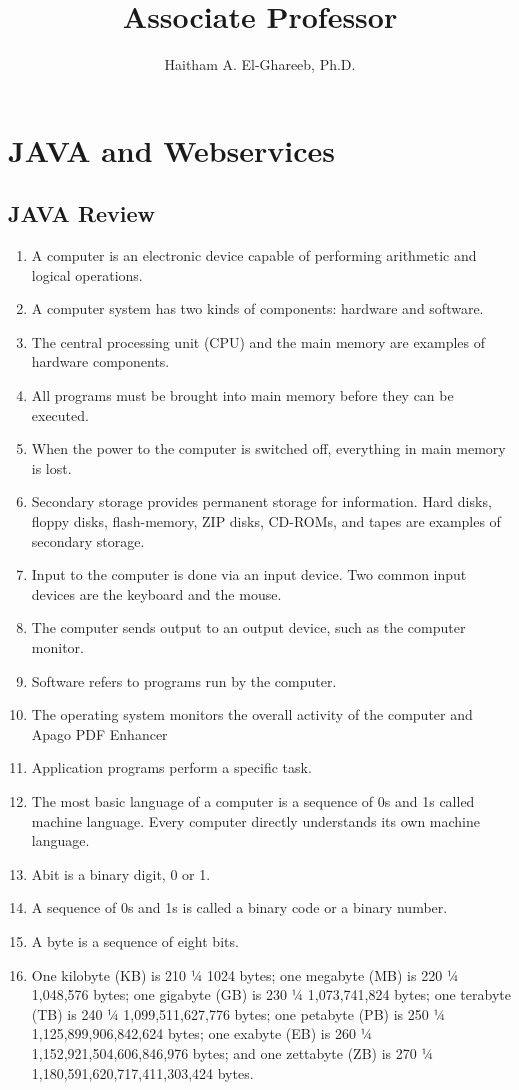 \documentclass[12pt,a4paper,final,twoside,onecolumn,titlepage]{book}
\author{Haitham A. El-Ghareeb, Ph.D.}
\title{Associate Professor}
\begin{document}
\cleardoublepage
{}
\tableofcontents

\chapter{JAVA and Webservices}
\section{JAVA Review}
\begin{enumerate}
\item A computer is an electronic device capable of performing arithmetic and logical operations.
\item A computer system has two kinds of components: hardware and software.
\item The central processing unit (CPU) and the main memory are examples of hardware components.
\item All programs must be brought into main memory before they can be executed.
\item When the power to the computer is switched off, everything in main memory is lost.
\item Secondary storage provides permanent storage for information. Hard disks, floppy disks, flash-memory, ZIP disks, CD-ROMs, and tapes are examples of secondary storage.
\item Input to the computer is done via an input device. Two common input devices are the keyboard and the mouse.
\item The computer sends output to an output device, such as the computer monitor.
\item Software refers to programs run by the computer.
\item The operating system monitors the overall activity of the computer and Apago PDF Enhancer
\item Application programs perform a specific task.
\item The most basic language of a computer is a sequence of 0s and 1s called machine language. Every computer directly understands its own machine language.
\item  Abit is a binary digit, 0 or 1.
\item A sequence of 0s and 1s is called a binary code or a binary number.
\item A byte is a sequence of eight bits.
\item One kilobyte (KB) is 210 1⁄4 1024 bytes; one megabyte (MB) is 220 1⁄4 1,048,576 bytes; one gigabyte (GB) is 230 1⁄4 1,073,741,824 bytes; one terabyte (TB) is 240 1⁄4 1,099,511,627,776 bytes; one petabyte (PB) is 250 1⁄4 1,125,899,906,842,624 bytes; one exabyte (EB) is 260 1⁄4 1,152,921,504,606,846,976 bytes; and one zettabyte (ZB) is 270 1⁄4 1,180,591,620,717,411,303,424 bytes.

\end{enumerate}
\end{document}
